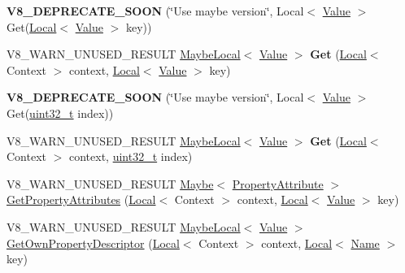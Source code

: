 \begin{DoxyCompactItemize}
{\bfseries V8\+\_\+\+D\+E\+P\+R\+E\+C\+A\+T\+E\+\_\+\+S\+O\+ON} (\char`\"{}Use maybe version\char`\"{}, Local$<$ \mbox{\hyperlink{classv8_1_1Value}{Value}} $>$ Get(\mbox{\hyperlink{classv8_1_1Local}{Local}}$<$ \mbox{\hyperlink{classv8_1_1Value}{Value}} $>$ key))
\item 
\mbox{\label{classv8_1_1Object_abe2967d3b14fe56c00718cc29441d67b}} 
V8\+\_\+\+W\+A\+R\+N\+\_\+\+U\+N\+U\+S\+E\+D\+\_\+\+R\+E\+S\+U\+LT \mbox{\hyperlink{classv8_1_1MaybeLocal}{Maybe\+Local}}$<$ \mbox{\hyperlink{classv8_1_1Value}{Value}} $>$ {\bfseries Get} (\mbox{\hyperlink{classv8_1_1Local}{Local}}$<$ Context $>$ context, \mbox{\hyperlink{classv8_1_1Local}{Local}}$<$ \mbox{\hyperlink{classv8_1_1Value}{Value}} $>$ key)
\item 
\mbox{\label{classv8_1_1Object_ac27f1b680e53d4c9c879aac3c7380202}} 
{\bfseries V8\+\_\+\+D\+E\+P\+R\+E\+C\+A\+T\+E\+\_\+\+S\+O\+ON} (\char`\"{}Use maybe version\char`\"{}, Local$<$ \mbox{\hyperlink{classv8_1_1Value}{Value}} $>$ Get(\mbox{\hyperlink{classuint32__t}{uint32\+\_\+t}} index))
\item 
\mbox{\label{classv8_1_1Object_a9e9eb0c0eef42208d45f3ca4a1f78e87}} 
V8\+\_\+\+W\+A\+R\+N\+\_\+\+U\+N\+U\+S\+E\+D\+\_\+\+R\+E\+S\+U\+LT \mbox{\hyperlink{classv8_1_1MaybeLocal}{Maybe\+Local}}$<$ \mbox{\hyperlink{classv8_1_1Value}{Value}} $>$ {\bfseries Get} (\mbox{\hyperlink{classv8_1_1Local}{Local}}$<$ Context $>$ context, \mbox{\hyperlink{classuint32__t}{uint32\+\_\+t}} index)
\item 
V8\+\_\+\+W\+A\+R\+N\+\_\+\+U\+N\+U\+S\+E\+D\+\_\+\+R\+E\+S\+U\+LT \mbox{\hyperlink{classv8_1_1Maybe}{Maybe}}$<$ \mbox{\hyperlink{namespacev8_a05f25f935e108a1ea2d150e274602b87}{Property\+Attribute}} $>$ \mbox{\hyperlink{classv8_1_1Object_a090096cdd0146a96d922fcf5354b98e4}{Get\+Property\+Attributes}} (\mbox{\hyperlink{classv8_1_1Local}{Local}}$<$ Context $>$ context, \mbox{\hyperlink{classv8_1_1Local}{Local}}$<$ \mbox{\hyperlink{classv8_1_1Value}{Value}} $>$ key)
\item 
V8\+\_\+\+W\+A\+R\+N\+\_\+\+U\+N\+U\+S\+E\+D\+\_\+\+R\+E\+S\+U\+LT \mbox{\hyperlink{classv8_1_1MaybeLocal}{Maybe\+Local}}$<$ \mbox{\hyperlink{classv8_1_1Value}{Value}} $>$ \mbox{\hyperlink{classv8_1_1Object_a185e9ea7736cf156bacef0ec2d0e498f}{Get\+Own\+Property\+Descriptor}} (\mbox{\hyperlink{classv8_1_1Local}{Local}}$<$ Context $>$ context, \mbox{\hyperlink{classv8_1_1Local}{Local}}$<$ \mbox{\hyperlink{classv8_1_1Name}{Name}} $>$ key)

\end{DoxyCompactItemize}
